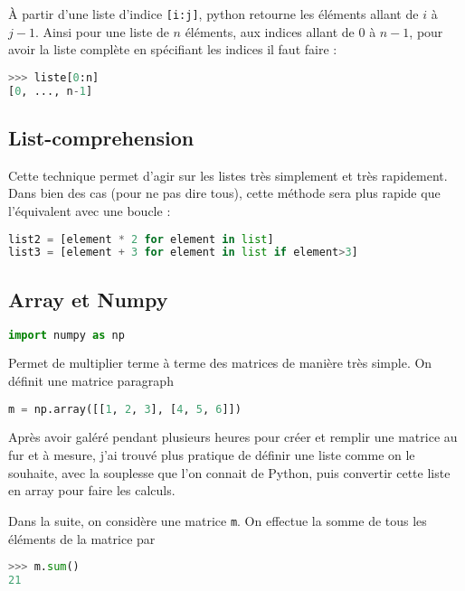 \documentclass[a4paper,twoside]{article}
\begin{document}
\begin{attention}
À partir d'une liste d'indice \texttt{[i:j]}, python retourne les éléments allant de $i$ à $j-1$. Ainsi pour une liste de $n$ éléments, aux indices allant de $0$ à $n-1$, pour avoir la liste complète en spécifiant les indices il faut faire :
\begin{lstlisting}[language=python]
>>> liste[0:n]
[0, ..., n-1]
\end{lstlisting}
\end{attention}


\subsection{List-comprehension}
Cette technique permet d'agir sur les listes très simplement et très rapidement. Dans bien des cas (pour ne pas dire tous), cette méthode sera plus rapide que l'équivalent avec une boucle :
\begin{lstlisting}[language=python]
list2 = [element * 2 for element in list]
list3 = [element + 3 for element in list if element>3]
\end{lstlisting}

\subsection{Array et Numpy}
\begin{lstlisting}[language=python]
import numpy as np
\end{lstlisting}

Permet de multiplier terme à terme des matrices de manière très simple. On définit une matrice paragraph
\begin{lstlisting}[language=python]
m = np.array([[1, 2, 3], [4, 5, 6]])
\end{lstlisting}

Après avoir galéré pendant plusieurs heures pour créer et remplir une matrice au fur et à mesure, j'ai trouvé plus pratique de définir une liste comme on le souhaite, avec la souplesse que l'on connait de Python, puis convertir cette liste en array pour faire les calculs.

\bigskip

Dans la suite, on considère une matrice \texttt{m}. On effectue la somme de tous les éléments de la matrice par
\begin{lstlisting}[language=python]
>>> m.sum()
21
\end{lstlisting}
\end{document}
